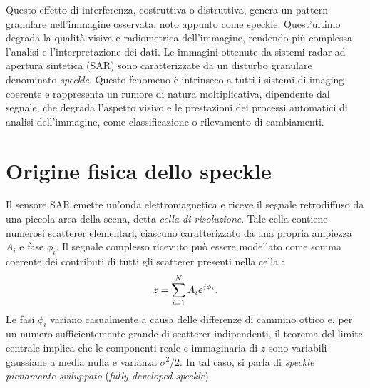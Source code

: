 Questo effetto di interferenza, costruttiva o distruttiva, genera un pattern granulare nell’immagine osservata, 
noto appunto come speckle. Quest'ultimo degrada la qualità visiva e radiometrica dell’immagine, rendendo più complessa l’analisi e l’interpretazione dei dati.
Le immagini ottenute da sistemi radar ad apertura sintetica (SAR) sono caratterizzate da un disturbo granulare denominato \emph{speckle}.  
Questo fenomeno è intrinseco a tutti i sistemi di imaging coerente e rappresenta un rumore di natura moltiplicativa, dipendente dal segnale, che degrada l’aspetto visivo e le prestazioni dei processi automatici di analisi dell’immagine, come classificazione o rilevamento di cambiamenti.
\section{Origine fisica dello speckle}
Il sensore SAR emette un’onda elettromagnetica e riceve il segnale retrodiffuso da una piccola area della scena, detta \emph{cella di risoluzione}.  
Tale cella contiene numerosi scatterer elementari, ciascuno caratterizzato da una propria ampiezza $A_i$ e fase $\phi_i$.  
Il segnale complesso ricevuto può essere modellato come somma coerente dei contributi di tutti gli scatterer presenti nella cella \cite{6616053}:
\begin{equation}
  \makebox[\textwidth][c]{%
    $\displaystyle
      z = \sum_{i=1}^{N} A_i e^{j \phi_i}.
    $%
  }
\end{equation}
Le fasi $\phi_i$ variano casualmente a causa delle differenze di cammino ottico e, per un numero sufficientemente grande di scatterer indipendenti, il teorema del limite centrale implica che le componenti reale e immaginaria di $z$ sono variabili gaussiane a media nulla e varianza $\sigma^2 / 2$.  
In tal caso, si parla di \emph{speckle pienamente sviluppato} (\emph{fully developed speckle}).
